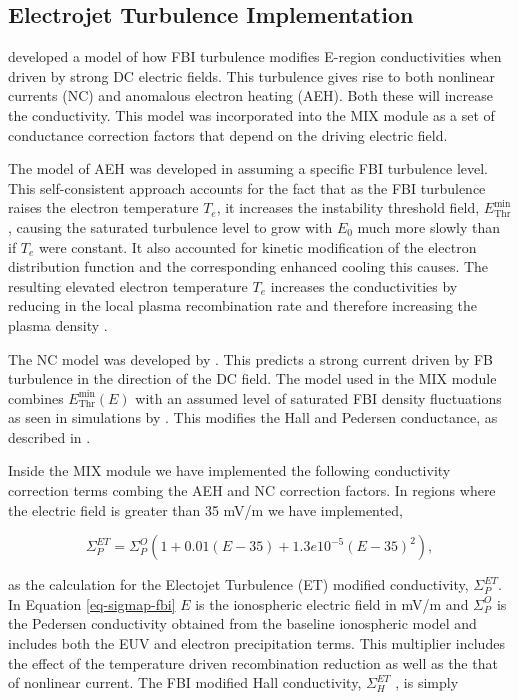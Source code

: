\documentclass[draft,jgrga]{agutex}
\begin{document}
\begin{article}
\subsection{Electrojet Turbulence Implementation}
\label{sec-ET}

\cite{2011JGRA..116.9304D} developed a model of how FBI turbulence modifies E-region conductivities when driven by strong DC electric fields.  This turbulence gives rise to both nonlinear currents (NC) and anomalous electron heating (AEH). Both these will increase the conductivity. This model was incorporated into the MIX module as a set
of conductance correction factors that depend on the driving electric field.

The model of AEH was developed in \cite{2003JGRA..108.1350D} assuming a specific FBI turbulence level. This self-consistent approach accounts for the fact that as the FBI turbulence raises the electron temperature $T_e$, it increases the instability threshold field, $E_{\mathrm{Thr}}^{\min}$, causing the saturated turbulence level to grow with $E_0$ much more slowly than if $T_e$ were constant. It also accounted for kinetic modification of the electron distribution function and the corresponding enhanced cooling this causes.  The resulting elevated electron temperature $T_{e}$ increases the conductivities by reducing in the local plasma recombination rate and therefore increasing the plasma density \cite{1978SVPCS..10.....G,1990AdSpR..10..239S,2003JGRA..108.1350D,2006GeoRL..3313809M}.

The NC model was developed by \cite{1996GeoRL..23.3333O,1997AnGeo..15..899O}.  This predicts a strong current driven by FB turbulence in the direction of the DC field.  The model used in the MIX module combines $E_{\mathrm{Thr}}^{\min}(E)$ with an assumed level of saturated FBI density fluctuations as seen in simulations by \cite{2013JGRA..118.1306O}. This modifies the Hall and Pedersen conductance, as described in \cite{2011JGRA..116.9304D}.

Inside the MIX module we have implemented the following conductivity correction terms combing the AEH and NC correction factors.   In regions where the electric field is greater than 35 mV/m we have implemented, 

\begin{equation}
\label{eq-sigmap-fbi}
\Sigma_P^{ET} = \Sigma_P^O(1+0.01 (E - 35) + 1.3e10^{-5}(E - 35)^2),
\end{equation}

as the calculation for the Electojet Turbulence (ET) modified conductivity, $\Sigma_P^{ET}$.  In Equation \ref{eq-sigmap-fbi} $E$ is the ionospheric electric field in mV/m and $\Sigma_P^O$ is the Pedersen conductivity obtained from the baseline ionospheric model and includes both the EUV and electron precipitation terms.  This multiplier includes the effect of the temperature driven recombination reduction as well as the that of nonlinear current.  The FBI modified Hall conductivity, $\Sigma_H^{ET}$ ,  is simply 


\end{article}
\end{document}
